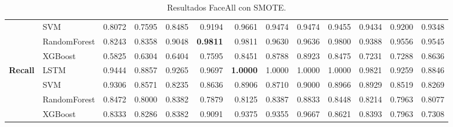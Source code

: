 \begin{table}[h]
\begin{adjustbox}{max width=15cm}
\begin{tabular}{|c|l|r|r|r|r|r|r|r|r|r|r|r|}
			& SVM &  0.8072 &  0.7595 &  0.8485 &  0.9194 &  0.9661 &  0.9474 &  0.9474 &  0.9455 &  0.9434 &  0.9200 &  0.9348 \\
			& RandomForest &  0.8243 &  0.8358 &  0.9048 &  \textbf{0.9811} &  0.9811 &  0.9630 &  0.9636 &  0.9800 &  0.9388 &  0.9556 &  0.9545 \\
			& XGBoost &  0.5825 &  0.6304 &  0.6404 &  0.7595 &  0.8451 &  0.8788 &  0.8923 &  0.8475 &  0.7231 &  0.7288 &  0.8636 \\
			\hline
			\textbf{Recall} & LSTM &  0.9444 &  0.8857 &  0.9265 &  0.9697 &  \textbf{1.0000} &  1.0000 &  1.0000 &  1.0000 &  0.9821 &  0.9259 &  0.8846 \\
			& SVM &  0.9306 &  0.8571 &  0.8235 &  0.8636 &  0.8906 &  0.8710 &  0.9000 &  0.8966 &  0.8929 &  0.8519 &  0.8269 \\
			& RandomForest &  0.8472 &  0.8000 &  0.8382 &  0.7879 &  0.8125 &  0.8387 &  0.8833 &  0.8448 &  0.8214 &  0.7963 &  0.8077 \\
			& XGBoost &  0.8333 &  0.8286 &  0.8382 &  0.9091 &  0.9375 &  0.9355 &  0.9667 &  0.8621 &  0.8393 &  0.7963 &  0.7308 \\
			\hline
		\end{tabular}
	\end{adjustbox}
	\caption{Resultados FaceAll con SMOTE.}
	\label{tab:faceAllSMOTE}
\end{table}

